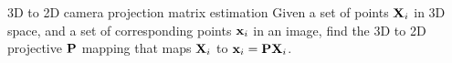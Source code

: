 \documentclass[times,t]{beamer}
\begin{document}
\begin{frame}{3D  to  2D camera projection matrix estimation}
  Given a set of points $\mathbf{X}_i$ in 3D space, and a set
  of corresponding points $\mathbf{x}_i$ in an image, find the 3D to 2D projective
  $\mathbf{P}$ mapping
  that maps $\mathbf{X}_i$ to $\mathbf{x}_i  =  \mathbf{P}\mathbf{X}_i$.
\end{frame}
\end{document}
